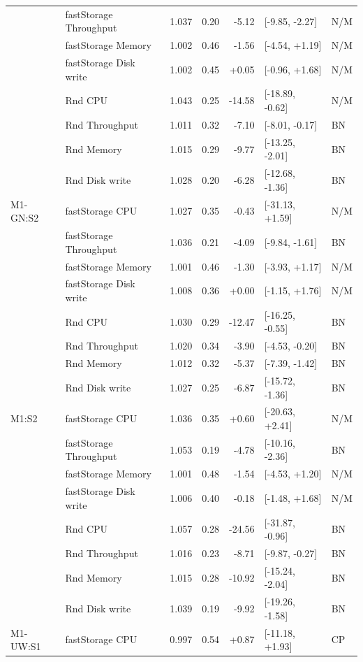 \begin{longtable}{@{}llrrrll@{}}
 & fastStorage Throughput & 1.037 & 0.20 & -5.12 & [-9.85, -2.27] & N/M \\
 & fastStorage Memory & 1.002 & 0.46 & -1.56 & [-4.54, +1.19] & N/M \\
 & fastStorage Disk write & 1.002 & 0.45 & +0.05 & [-0.96, +1.68] & N/M \\
 & Rnd CPU & 1.043 & 0.25 & -14.58 & [-18.89, -0.62] & N/M \\
 & Rnd Throughput & 1.011 & 0.32 & -7.10 & [-8.01, -0.17] & BN \\
 & Rnd Memory & 1.015 & 0.29 & -9.77 & [-13.25, -2.01] & BN \\
 & Rnd Disk write & 1.028 & 0.20 & -6.28 & [-12.68, -1.36] & BN \\
\addlinespace
M1-GN:S2 & fastStorage CPU & 1.027 & 0.35 & -0.43 & [-31.13, +1.59] & N/M \\
 & fastStorage Throughput & 1.036 & 0.21 & -4.09 & [-9.84, -1.61] & BN \\
 & fastStorage Memory & 1.001 & 0.46 & -1.30 & [-3.93, +1.17] & N/M \\
 & fastStorage Disk write & 1.008 & 0.36 & +0.00 & [-1.15, +1.76] & N/M \\
 & Rnd CPU & 1.030 & 0.29 & -12.47 & [-16.25, -0.55] & BN \\
 & Rnd Throughput & 1.020 & 0.34 & -3.90 & [-4.53, -0.20] & BN \\
 & Rnd Memory & 1.012 & 0.32 & -5.37 & [-7.39, -1.42] & BN \\
 & Rnd Disk write & 1.027 & 0.25 & -6.87 & [-15.72, -1.36] & BN \\
\addlinespace
M1:S2 & fastStorage CPU & 1.036 & 0.35 & +0.60 & [-20.63, +2.41] & N/M \\
 & fastStorage Throughput & 1.053 & 0.19 & -4.78 & [-10.16, -2.36] & BN \\
 & fastStorage Memory & 1.001 & 0.48 & -1.54 & [-4.53, +1.20] & N/M \\
 & fastStorage Disk write & 1.006 & 0.40 & -0.18 & [-1.48, +1.68] & N/M \\
 & Rnd CPU & 1.057 & 0.28 & -24.56 & [-31.87, -0.96] & BN \\
 & Rnd Throughput & 1.016 & 0.23 & -8.71 & [-9.87, -0.27] & BN \\
 & Rnd Memory & 1.015 & 0.28 & -10.92 & [-15.24, -2.04] & BN \\
 & Rnd Disk write & 1.039 & 0.19 & -9.92 & [-19.26, -1.58] & BN \\
\addlinespace
M1-UW:S1 & fastStorage CPU & 0.997 & 0.54 & +0.87 & [-11.18, +1.93] & CP \\

\end{longtable}
